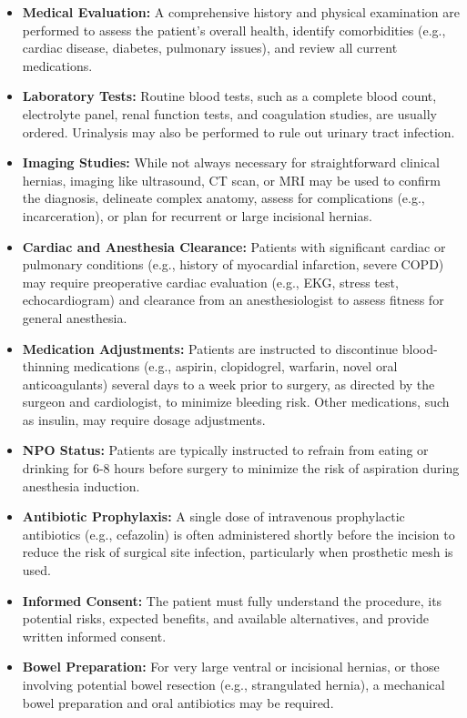 \begin{itemize}
  \item \textbf{Medical Evaluation:} A comprehensive history and physical examination are performed to assess the patient's overall health, identify comorbidities (e.g., cardiac disease, diabetes, pulmonary issues), and review all current medications.
  
  \item \textbf{Laboratory Tests:} Routine blood tests, such as a complete blood count, electrolyte panel, renal function tests, and coagulation studies, are usually ordered. Urinalysis may also be performed to rule out urinary tract infection.
  
  \item \textbf{Imaging Studies:} While not always necessary for straightforward clinical hernias, imaging like ultrasound, CT scan, or MRI may be used to confirm the diagnosis, delineate complex anatomy, assess for complications (e.g., incarceration), or plan for recurrent or large incisional hernias.
  
  \item \textbf{Cardiac and Anesthesia Clearance:} Patients with significant cardiac or pulmonary conditions (e.g., history of myocardial infarction, severe COPD) may require preoperative cardiac evaluation (e.g., EKG, stress test, echocardiogram) and clearance from an anesthesiologist to assess fitness for general anesthesia.
  
  \item \textbf{Medication Adjustments:} Patients are instructed to discontinue blood-thinning medications (e.g., aspirin, clopidogrel, warfarin, novel oral anticoagulants) several days to a week prior to surgery, as directed by the surgeon and cardiologist, to minimize bleeding risk. Other medications, such as insulin, may require dosage adjustments.
  
  \item \textbf{NPO Status:} Patients are typically instructed to refrain from eating or drinking for 6-8 hours before surgery to minimize the risk of aspiration during anesthesia induction.
  
  \item \textbf{Antibiotic Prophylaxis:} A single dose of intravenous prophylactic antibiotics (e.g., cefazolin) is often administered shortly before the incision to reduce the risk of surgical site infection, particularly when prosthetic mesh is used.
  
  \item \textbf{Informed Consent:} The patient must fully understand the procedure, its potential risks, expected benefits, and available alternatives, and provide written informed consent.
  
  \item \textbf{Bowel Preparation:} For very large ventral or incisional hernias, or those involving potential bowel resection (e.g., strangulated hernia), a mechanical bowel preparation and oral antibiotics may be required.
\end{itemize}

